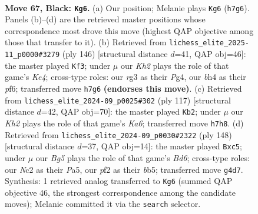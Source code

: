 \documentclass[11pt]{article}
\begin{document}
\clearpage

\begin{figure}[p]\centering
\begin{subfigure}{0.46\textwidth}\centering
\resizebox{\linewidth}{!}{%
\newchessgame
\chessboard[
  setfen={8/1R5k/7r/8/r5bB/6R1/2n2P2/7K b - - 14 67},
  showmover=false,
  pgfstyle=straightmove, color=movearrow, markmove={h7-g6}
]}
\caption{}
\end{subfigure}\hfill
\begin{subfigure}{0.46\textwidth}\centering
\resizebox{\linewidth}{!}{%
\newchessgame
\chessboard[
  setfen={8/5k2/5p2/8/1r2KRPN/8/8/8 w - - 1 74},
  showmover=false,
  pgfstyle=straightmove, color=movearrow, markmove={e4-f3}
]}
\caption{}
\end{subfigure}
\\[4pt]
\begin{subfigure}{0.46\textwidth}\centering
\resizebox{\linewidth}{!}{%
\newchessgame
\chessboard[
  setfen={R7/8/8/4K3/4B3/k4r2/8/4r3 b - - 5 59},
  showmover=false,
  pgfstyle=straightmove, color=movearrow, markmove={a3-b2}
]}
\caption{}
\end{subfigure}\hfill
\begin{subfigure}{0.46\textwidth}\centering
\resizebox{\linewidth}{!}{%
\newchessgame
\chessboard[
  setfen={8/4K3/2rB2k1/PbpR4/8/8/8/8 w - - 4 75},
  showmover=false,
  pgfstyle=straightmove, color=movearrow, markmove={d6-c5}
]}
\caption{}
\end{subfigure}
\caption{\textbf{Move 67, Black: \texttt{Kg6}.} (a) Our position; Melanie plays \texttt{Kg6} (\texttt{h7g6}). Panels (b)--(d) are the retrieved master positions whose correspondence most drove this move (highest QAP objective among those that transfer to it). (b) Retrieved from \texttt{lichess\_elite\_2025-11\_p0000\#3279} (ply 146) [structural distance $d$=41, QAP obj=46]: the master played \texttt{Kf3}; under $\mu$ our \emph{Kh2} plays the role of that game's \emph{Ke4}; cross-type roles: our \emph{r}g3 as their \emph{P}g4, our \emph{b}h4 as their \emph{p}f6; transferred move \texttt{h7g6} \textbf{(endorses this move)}. (c) Retrieved from \texttt{lichess\_elite\_2024-09\_p0025\#302} (ply 117) [structural distance $d$=42, QAP obj=70]: the master played \texttt{Kb2}; under $\mu$ our \emph{Kh2} plays the role of that game's \emph{Ka6}; transferred move \texttt{h7h8}. (d) Retrieved from \texttt{lichess\_elite\_2024-09\_p0030\#2322} (ply 148) [structural distance $d$=37, QAP obj=14]: the master played \texttt{Bxc5}; under $\mu$ our \emph{Bg5} plays the role of that game's \emph{Bd6}; cross-type roles: our \emph{N}c2 as their \emph{P}a5, our \emph{p}f2 as their \emph{b}b5; transferred move \texttt{g4d7}. Synthesis: 1 retrieved analog transferred to \texttt{Kg6} (summed QAP objective 46, the strongest correspondence among the candidate moves); Melanie committed it via the \texttt{search} selector.}
\label{fig:thought-m133}
\end{figure}
\end{document}

